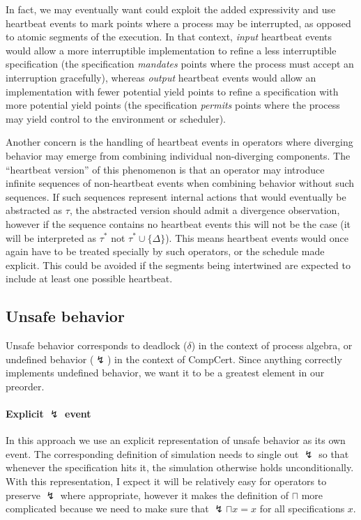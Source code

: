 \documentclass[11pt]{article}
\begin{document}
In fact,
we may eventually want could exploit the added expressivity
and use heartbeat events to mark points
where a process may be interrupted,
as opposed to atomic segments of the execution.
In that context,
\emph{input} heartbeat events
would allow a more interruptible implementation
to refine a less interruptible specification
(the specification \emph{mandates} points where
the process must accept an interruption gracefully),
whereas \emph{output} heartbeat events
would allow an implementation with fewer potential yield points
to refine a specification with more potential yield points
(the specification \emph{permits} points where
the process may yield control to the environment or scheduler).

Another concern is the handling of heartbeat events
in operators where diverging behavior may emerge
from combining individual non-diverging components.
The ``heartbeat version'' of this phenomenon
is that an operator may introduce
infinite sequences of non-heartbeat events
when combining behavior
without such sequences.
If such sequences represent
internal actions that would eventually be abstracted as $\tau$,
the abstracted version should admit a divergence observation, however
if the sequence contains no heartbeat events this will not be the case
(it will be interpreted as $\tau^*$ not $\tau^* \cup \{\Delta\}$).
This means heartbeat events would once again
have to be treated specially by such operators,
or the schedule made explicit.
This could be avoided
if the segments being intertwined
are expected to include at least one possible heartbeat.


\subsection{Unsafe behavior} %

Unsafe behavior
corresponds to deadlock ($\delta$) in the context of process algebra,
or undefined behavior ($\lightning$) in the context of CompCert.
Since anything correctly implements undefined behavior,
we want it to be a greatest element in our preorder.

\paragraph{Explicit $\lightning$ event}

In this approach we use an explicit representation of
unsafe behavior as its own event.
The corresponding definition of simulation needs to single out $\lightning$
so that whenever the specification hits it,
the simulation otherwise holds unconditionally.
With this representation,
I expect it will be relatively easy
for operators to preserve $\lightning$ where appropriate,
however it makes the definition of $\sqcap$
more complicated because we need to make sure that
$\lightning \sqcap x = x$ for all specifications $x$.
\end{document}
